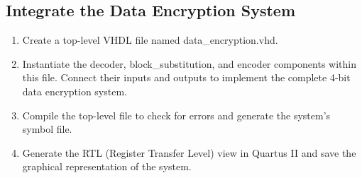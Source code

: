 \documentclass[]{article}
\begin{document}
\subsection{Integrate the Data Encryption System}
\renewcommand{\theenumi}{(\arabic{enumi})}
\begin{enumerate}
    \item Create a top-level VHDL file named data\_encryption.vhd.
    \item Instantiate the decoder, block\_substitution, and encoder components within this file. Connect their inputs and outputs to implement the complete 4-bit data encryption system.
    \item Compile the top-level file to check for errors and generate the system's symbol file.
    \item Generate the RTL (Register Transfer Level) view in Quartus II and save the graphical representation of the system.
\end{enumerate}
\end{document}
